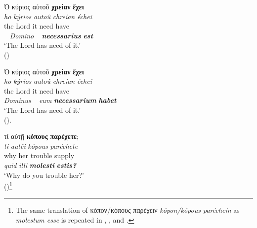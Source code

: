 \documentclass[output=paper,colorlinks,citecolor=brown]{langscibook}
\begin{document}
\begin{enumerate}
\z

\z


\ea\label{ex:bj:17}

\ea\label{ex:bj:17a}

\gllll Ὁ κύριος αὐτοῦ \textbf{χρείαν} \textbf{ἔχει}\\
 \textit{ho} \textit{kýrios} \textit{autoû} \textit{chreían} \textit{échei}\\
the Lord it need have\\
~ \emph{Domino} ~ {\textbf{\itshape necessarius} \textbf{\itshape est}}\\
\glt `The Lord has need of it.' \\
\hspace*{\fill}()

\ex\label{ex:bj:17b}

\gllll Ὁ κύριος αὐτοῦ \textbf{χρείαν} \textbf{ἔχει}\\
 \textit{ho} \textit{kýrios} \textit{autoû} \textit{chreían} \textit{échei}\\
the Lord it need have\\
\emph{Dominus} ~ \emph{eum} \textbf{\itshape necessarium} \textbf{\itshape habet}\\
\glt `The Lord has need of it.' \\
\hspace*{\fill}().

\ex\label{ex:bj:17c}

\gllll τί αὐτῇ \textbf{κόπους} \textbf{παρέχετε};\\
 \textit{tí} \textit{autêi} \textit{kópous} \textit{paréchete}\\
why her trouble supply\\
\emph{quid} \emph{illi} \textbf{\itshape molesti} \textbf{\itshape estis?}\\
\glt `Why do you trouble her?' \\
\hspace*{\fill}()\footnote{The same translation of κόπον/κόπους παρέχειν \emph{kópon/kópous paréchein} as \emph{molestum esse} is repeated in , , and .}

\z

\z


\end{enumerate}
\end{document}
